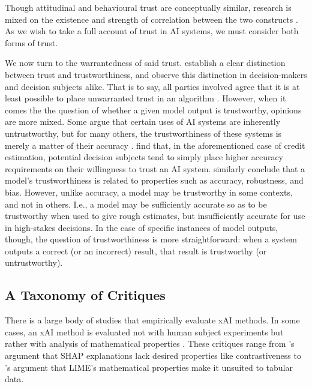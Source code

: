 Though attitudinal and behavioural trust are conceptually similar, research is mixed on the existence and strength of correlation between the two constructs \cite{ahmed_relationship_2009, kim_relation_2018}. As we wish to take a full account of trust in AI systems, we must consider both forms of trust.

We now turn to the warrantedness of said trust. \textcite{Vereschak_Alizadeh_Bailly_Caramiaux_2024} establish a clear distinction between trust and trustworthiness, and observe this distinction in decision-makers and decision subjects alike. That is to say, all parties involved agree that it is at least possible to place unwarranted trust in an algorithm \cite{Vereschak_Alizadeh_Bailly_Caramiaux_2024}. However, when it comes the the question of whether a given model output is trustworthy, opinions are more mixed. Some argue that certain uses of AI systems are inherently untrustworthy, but for many others, the trustworthiness of these systems is merely a matter of their accuracy \cite{Rebitschek_Gigerenzer_Wagner_2021}. \textcite{Rebitschek_Gigerenzer_Wagner_2021} find that, in the aforementioned case of credit estimation, potential decision subjects tend to simply place higher accuracy requirements on their willingness to trust an AI system. \textcite{jacovi_formalizing_2021} similarly conclude that a model's trustworthiness is related to properties such as accuracy, robustness, and bias. However, unlike accuracy, a model may be trustworthy in some contexts, and not in others. I.e., a model may be sufficiently accurate so as to be trustworthy when used to give rough estimates, but insufficiently accurate for use in high-stakes decisions. In the case of specific instances of model outputs, though, the question of trustworthiness is more straightforward: when a system outputs a correct (or an incorrect) result, that result is trustworthy (or untrustworthy).

\subsection{A Taxonomy of Critiques}
There is a large body of studies that empirically evaluate xAI methods. In some cases, an xAI method is evaluated not with human subject experiments but rather with analysis of mathematical properties \cite{doshi-velez_towards_2017}. These critiques range from \textcite{kumar_problems_2020}'s argument that SHAP explanations lack desired properties like contrastiveness to \textcite{lundberg_unified_2017}'s argument that LIME's mathematical properties make it unsuited to tabular data.

